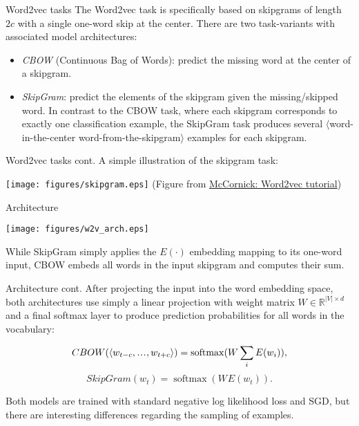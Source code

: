 \documentclass[style=upen, size=14pt]{powerdot}
\DeclareMathOperator*{\softmax}{softmax}
\newcommand\varlist{,\makebox[1em][c]{.\hfil.\hfil.},}
\newcommand{\gold}{\color{arany}}
\theoremstyle{definition}
\begin{document}
\begin{slide}[toc=Tasks]{Word2vec tasks}
  The Word2vec task is specifically based on skipgrams of length $2c$ with a
  single one-word skip at the center. There are two task-variants with
  associated model architectures:
  \begin{itemize}
  \item \emph{\gold CBOW} (Continuous Bag of Words): predict the missing word at
    the center of a skipgram. 
  \item \emph{\gold SkipGram}: predict the elements of the skipgram given the
    missing/skipped word. In contrast to the CBOW task, where each skipgram
    corresponds to exactly one classification example, the SkipGram task
    produces several $\langle$word-in-the-center word-from-the-skipgram$\rangle$
    examples for each skipgram.
  \end{itemize} 
\end{slide}

\begin{slide}[toc=]{Word2vec tasks cont.}
  A simple illustration of the skipgram task:
  \begin{center}
    \texttt{[image: figures/skipgram.eps]}
    \footnotesize{(Figure from \href{http://mccormickml.com/2016/04/19/word2vec-tutorial-the-skip-gram-model/}{McCornick: Word2vec tutorial})}
  \end{center}  
\end{slide}

\begin{slide}[toc=Architecture]{Architecture}
  \begin{center}
    \texttt{[image: figures/w2v\_arch.eps]}
  \end{center}
  While SkipGram simply applies the $E(\cdot)$ embedding mapping to its one-word
  input, CBOW embeds all words in the input skipgram and computes their sum.
\end{slide}

\begin{slide}[toc=]{Architecture cont.}
  After projecting the input into the word embedding space, both architectures
  use simply a linear projection with weight matrix
  $W \in \mathbb R^{|V|\times d}$ and a final softmax layer to produce
  prediction probabilities for all words in the vocabulary:
   
  \begin{small}
  $$
  CBOW(\langle w_{t-c}\varlist w_{t+c} \rangle) = \softmax(W\sum_{i}E(w_i)),
  $$
  $$
  SkipGram(w_t) = \softmax(W_{}E(w_t)).
  $$
  \end{small}

  Both models are trained with standard negative log likelihood loss and SGD,
  but there are interesting differences regarding the sampling of examples.
\end{slide}
\end{document}
